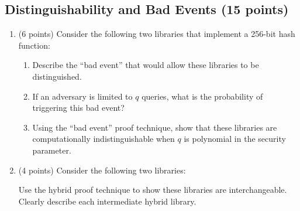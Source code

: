 \documentclass[10pt,a4paper,american]{exam}
\begin{document}
\subsection{Distinguishability and Bad Events (15 points)}

\begin{enumerate}
	\item (6 points) Consider the following two libraries that implement a 256-bit hash function:
	      \begin{center}
	      \end{center}

	      \begin{enumerate}
		      \item Describe the ``bad event'' that would allow these libraries to be distinguished.
		      \item If an adversary is limited to $q$ queries, what is the probability of triggering this bad event?
		      \item Using the ``bad event'' proof technique, show that these libraries are computationally indistinguishable when $q$ is polynomial in the security parameter.
	      \end{enumerate}

	\item (4 points) Consider the following two libraries:
	      \begin{center}
	      \end{center}
	      Use the hybrid proof technique to show these libraries are interchangeable. Clearly describe each intermediate hybrid library.


\end{enumerate}
\end{document}
